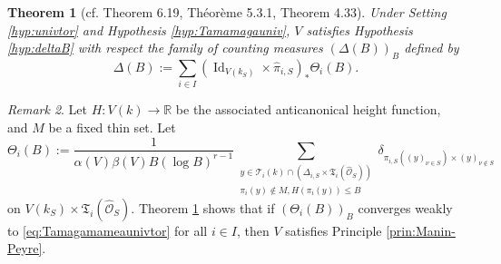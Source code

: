 \documentclass[11pt,letterpaper]{amsart}
\newcommand{\BR}{{\mathbb {R}}}
\newcommand{\CO}{{\mathcal {O}}}
\newcommand{\CTUT}{\mathcal{T}}
\newcommand{\FTUT}{\mathfrak{T}}
\theoremstyle{plain}
\numberwithin{equation}{section}
\newtheorem{theorem}{Theorem}[section]
\theoremstyle{definition}
\theoremstyle{remark}
\newtheorem{remark}[theorem]{Remark}
\begin{document}
\begin{theorem}[cf. \cite{Salberger} Theorem 6.19, \cite{Peyre2} Théorème 5.3.1, \cite{PeyreBeyond} Theorem 4.33]\label{thm:equidistunivtor}
	Under Setting \ref{hyp:univtor} and Hypothesis \ref{hyp:Tamamagauniv}, $V$ satisfies Hypothesis \ref{hyp:deltaB} with respect the family of counting measures $(\Delta(B))_B$ defined by \begin{equation}\label{eq:DeltaTheta}
		\Delta(B):=\sum_{i\in I}(\operatorname{Id}_{V(k_S)}\times\widehat{\pi}_{i,S})_{*}\Theta_i(B).
	\end{equation}
\end{theorem}
\begin{remark}
	Let $H:V(k)\to\BR$ be the associated anticanonical height function, and $M$ be a fixed thin set. Let
	\begin{equation}\label{eq:Thetai}
		\Theta_i(B):=\frac{1}{\alpha(V)\beta(V)B(\log B)^{r-1}}\sum_{\substack{y\in \CTUT_i(k)\cap (\varDelta_{i,S}\times\FTUT_i(\widehat{\CO}_S))\\\pi_i(y)\notin M, H(\pi_i(y))\leqslant B}}\delta_{\pi_{i,S}((y)_{\nu\in S})\times (y)_{\nu\notin S}}
	\end{equation} on $V(k_S)\times\FTUT_i(\widehat{\CO}_S)$. 
	Theorem \ref{thm:equidistunivtor} shows that if $(\Theta_i(B))_B$ converges weakly to \eqref{eq:Tamagamameaunivtor} for all $i\in I$, then $V$ satisfies Principle \ref{prin:Manin-Peyre}.
\end{remark}
\end{document}
